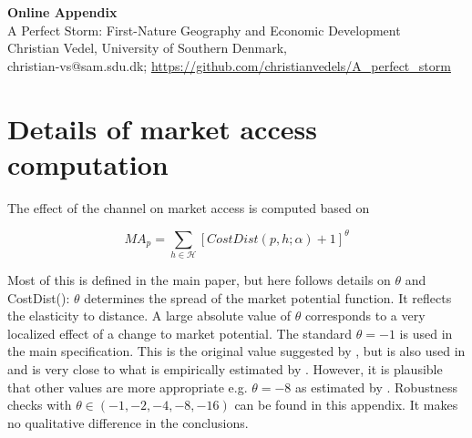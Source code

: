 \setcounter{table}{0}
\setcounter{figure}{0}
\setcounter{section}{0}
\renewcommand*{\thesection}{\Alph{section}}
\renewcommand{\thefigure}{A\arabic{figure}}
\renewcommand{\thetable}{A\arabic{table}}


\begin{title}

    \begin{center}
        
        \LARGE
        \textbf{Online Appendix} \\
        \Large
        A Perfect Storm: First-Nature Geography and Economic Development \\
        
        \vspace{0.5cm}
        \large
        Christian Vedel, University of Southern Denmark,\\
        \small
        \vspace{0.25cm}
        christian-vs@sam.sdu.dk; 
        \url{https://github.com/christianvedels/A_perfect_storm}
        
    \end{center}

    \localtableofcontents %
        
    \vfill
    
\end{title}


\section{Details of market access computation} \label{details_ma}

The effect of the channel on market access is computed based on 

\begin{equation}
\label{eq:MA2_a}
\textit{MA}_p = \sum_{h \in \mathscr{H}} [CostDist(p, h; \alpha) + 1]^\theta
\end{equation}

Most of this is defined in the main paper, but here follows details on $\theta$ and CostDist(): $\theta$ determines the spread of the market potential function. It reflects the elasticity to distance. A large absolute value of $\theta$ corresponds to a very localized effect of a change to market potential. The standard $\theta = -1$ is used in the main specification.  This is the original value suggested by \cite{Harris1954}, but is also used in \cite{rauch2022a} and is very close to what is empirically estimated by \cite{Redding2008}. However, it is plausible that other values are more appropriate e.g. $\theta = -8$ as estimated by \cite{Donaldson2016}. Robustness checks with $\theta \in (-1, -2, -4, -8, -16)$ can be found in this appendix. It makes no qualitative difference in the conclusions.  

